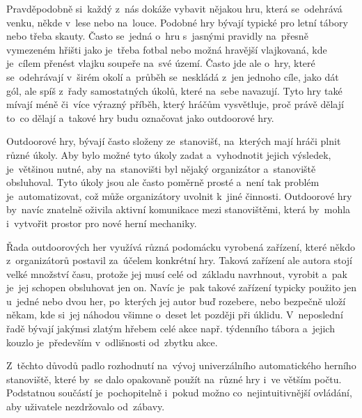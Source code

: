 Pravděpodobně si~každý z~nás dokáže vybavit nějakou hru, která se~odehrává venku, někde v~lese nebo na~louce.
Podobné hry bývají typické pro letní tábory nebo třeba skauty.
Často se~jedná o~hru s~jasnými pravidly na~přesně vymezeném hřišti jako je~třeba fotbal nebo možná hravější vlajkovaná, kde je~cílem přenést vlajku soupeře na~své území. 
Často jde ale o~hry, které se~odehrávají v~širém okolí a~průběh se~neskládá z~jen jednoho cíle, jako dát gól, ale spíš z~řady samostatných úkolů, které na~sebe navazují.
Tyto hry také mívají méně či~více výrazný příběh, který hráčům vysvětluje, proč právě dělají to~co dělají a~takové hry budu označovat jako outdoorové hry.

Outdoorové hry, bývají často složeny ze~stanovišť, na~kterých mají hráči plnit různé úkoly.
Aby bylo možné tyto úkoly zadat a~vyhodnotit jejich výsledek, je~většinou nutné, aby na~stanovišti byl nějaký organizátor a~stanoviště obsluhoval.
Tyto úkoly jsou ale často poměrně prosté a~není tak problém je~automatizovat, což může organizátory uvolnit k~jiné činnosti.
Outdoorové hry by~navíc znatelně oživila aktivní komunikace mezi stanovištěmi, která by~mohla i~vytvořit prostor pro nové herní mechaniky.

Řada outdoorových her využívá různá podomácku vyrobená zařízení, které někdo z~organizátorů postavil za~účelem konkrétní hry.
Taková zařízení ale autora stojí velké množství času, protože jej musí celé od~základu navrhnout, vyrobit a~pak je~jej schopen obsluhovat jen on.
Navíc je~pak takové zařízení typicky použito jen u~jedné nebo dvou her, po~kterých jej autor buď rozebere, nebo bezpečně uloží někam, kde si~jej náhodou všimne o~deset let později při úklidu.
V~neposlední řadě bývají jakýmsi zlatým hřebem celé akce např. týdenního tábora a~jejich kouzlo je~především v~odlišnosti od~zbytku akce.

Z~těchto důvodů padlo rozhodnutí na~vývoj univerzálního automatického herního stanoviště, které by~se dalo opakovaně použít na~různé hry i~ve větším počtu.
Podstatnou součástí je~pochopitelně i~pokud možno co~nejintuitivnější ovládání, aby uživatele nezdržovalo od~zábavy.





